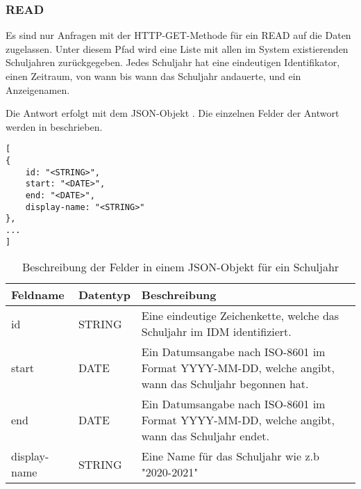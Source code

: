 \subsubsection{READ}
\label{sec:rest:api:school-years:read}
Es sind nur Anfragen mit der HTTP-GET-Methode für ein READ auf die Daten zugelassen.
Unter diesem Pfad wird eine Liste mit allen im System existierenden Schuljahren zurückgegeben.
Jedes Schuljahr hat eine eindeutigen Identifikator, einen Zeitraum, von wann bis wann das Schuljahr andauerte, und ein Anzeigenamen.

Die Antwort erfolgt mit dem JSON-Objekt . 
Die einzelnen Felder der Antwort werden in  beschrieben.

\begin{lstlisting}[caption={JSON-Antwort für einen GET-Aufruf des Pfads /api/school-years},label={lst:code:rest:api:school-years:read:ret},frame=tlrb]
[
{
    id: "<STRING>",
    start: "<DATE>",
    end: "<DATE>",
    display-name: "<STRING>"
},
...
]
\end{lstlisting}

\begin{longtable}{|p{}|p{}|p{}|}
		\caption{Beschreibung der Felder in einem JSON-Objekt für ein Schuljahr}
\endfoot
		\caption{Beschreibung der Felder in einem JSON-Objekt für ein Schuljahr}
		\label{tab:rest:api:school-years:read:ret:json}
\endlastfoot 
\hline
			\textbf{Feldname} & \textbf{Datentyp} & \textbf{Beschreibung} \\ \hline
\endhead
 id & STRING & Eine eindeutige Zeichenkette, welche das Schuljahr im IDM identifiziert. \\ \hline
 start & DATE & Ein Datumsangabe nach ISO-8601 im Format YYYY-MM-DD, welche angibt, wann das Schuljahr begonnen hat. \\ \hline
 end & DATE & Ein Datumsangabe nach ISO-8601 im Format YYYY-MM-DD, welche angibt, wann das Schuljahr endet. \\ \hline
 display-name & STRING & Eine Name für das Schuljahr wie z.b "2020-2021" \\ \hline
\end{longtable}
